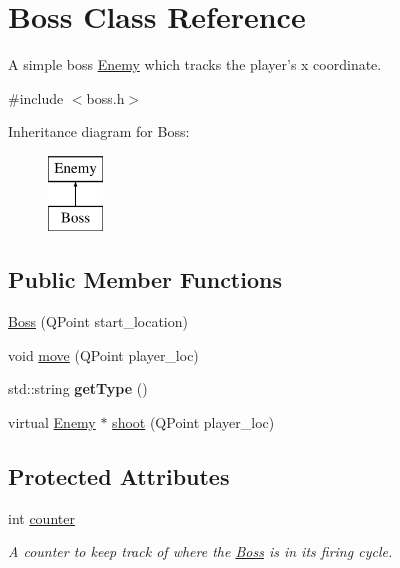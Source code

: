 \hypertarget{classBoss}{
\section{Boss Class Reference}
\label{classBoss}
}


A simple boss \hyperlink{classEnemy}{Enemy} which tracks the player's x coordinate.  




{\ttfamily \#include $<$boss.h$>$}

Inheritance diagram for Boss:\begin{figure}[H]
\begin{center}
\leavevmode
\includegraphics[height=2.000000cm]{classBoss}
\end{center}
\end{figure}
\subsection*{Public Member Functions}
\begin{DoxyCompactItemize}
\item 
\hyperlink{classBoss_af210e2207954567df9de3864e0140fd7}{Boss} (QPoint start\_\-location)
\item 
void \hyperlink{classBoss_a7ea6b19aa73f4c7b2d68fae9c0d3726f}{move} (QPoint player\_\-loc)
\item 
\hypertarget{classBoss_ae6ba0c94d4c5516ff05fddc9a0f1a203}{
std::string {\bfseries getType} ()}
\label{classBoss_ae6ba0c94d4c5516ff05fddc9a0f1a203}

\item 
virtual \hyperlink{classEnemy}{Enemy} $\ast$ \hyperlink{classBoss_a43e296701933cb2cc18d7d6cfe521de5}{shoot} (QPoint player\_\-loc)
\end{DoxyCompactItemize}
\subsection*{Protected Attributes}
\begin{DoxyCompactItemize}
\item 
\hypertarget{classBoss_a9c87e476d730f8ed3a925b2e07bbd945}{
int \hyperlink{classBoss_a9c87e476d730f8ed3a925b2e07bbd945}{counter}}
\label{classBoss_a9c87e476d730f8ed3a925b2e07bbd945}

\begin{DoxyCompactList}\small\item\em A counter to keep track of where the \hyperlink{classBoss}{Boss} is in its firing cycle. \end{DoxyCompactList}\end{DoxyCompactItemize}


